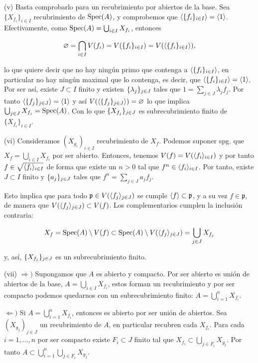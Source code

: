 \documentclass[../main.tex]{subfiles}
\begin{document}
(v) Basta comprobarlo para un recubrimiento por abiertos de la base. Sea $\{X_{f_i}\}_{i\in I}$ recubrimiento de $\text{Spec}(A)$, y comprobemos que $\langle \{f_i\}_{i\in I} \rangle = \langle 1 \rangle$. Efectivamente, como $\text{Spec}(A) = \bigcup_{i\in I}X_{f_i} $, entonces

\begin{equation}
  \varnothing = \bigcap_{i\in I} V(f_i) = V(\{f_i\}_{i\in I}) = V(\langle \{f_i\}_{i\in I} \rangle),
\end{equation}

lo que quiere decir que no hay ningún primo que contenga a $\langle \{f_i\}_{i\in I} \rangle$, en particular no hay ningún maximal que lo contenga, es decir, que $\langle \{f_i\}_{i\in I} \rangle = \langle 1 \rangle$. Por ser así, existe $J\subset I$ finito y existen $\{\lambda_j\}_{j\in J}$ tales que $1 = \sum_{j\in J} \lambda_j f_j$.
Por tanto $\langle  \{f_j\}_{j\in J} \rangle = \langle  1 \rangle$ y así  $V(\langle \{f_j\}_{j\in J} \rangle )= \varnothing$ lo que implica $\bigcup_{j\in J} X_{f_j} = \text{Spec}(A)$. Con lo que $\{X_{f_j}\}_{j\in J}$ es subrecubrimiento finito de $\{X_{f_i}\}_{i\in I}$.

(vi) Consideramos $(X_{g_i})_{i\in I}$ recubrimiento de $X_f$. Podemos suponer spg. que $X_f = \bigcup_{i\in I} X_{f_i}$ por ser abierto. Entonces, tenemos $V(f) = V(\langle f_i \rangle_{i\in I})$ y por tanto $f\in \sqrt{\langle f_i \rangle_{i\in I}}$ de forma que existe un $n>0$ tal que $f^n \in \langle f_i \rangle_{i\in I}$.
Por tanto, existe $J\subset I$ finito y $\{a_j\}_{j\in J}$ tales que $f^n = \sum_{j\in J}a_j f_j$.

Esto implica que para todo $\mathfrak p \in  V(\langle f_j \rangle_{j\in J})$ se cumple $\langle f \rangle \subset \mathfrak p$, y a su vez $f \in \mathfrak p$, de manera que $ V(\langle f_j \rangle_{j\in J}) \subset V(f)$. Los complementarios cumplen la inclusión contraria:

\[ X_f = \text{Spec}(A) \setminus V(f) \subset \text{Spec}(A) \setminus V(\langle f_j \rangle_{j\in J}) = \bigcup_{j\in J} X_{f_j} \]

y, así, $\{X_{f_j}\}_{j\in J}$ es un subrecubrimiento finito.

(vii) $\Rightarrow)$ Supongamos que $A$ es abierto y compacto. Por ser abierto es unión de abiertos de la base, $A=\bigcup_{i\in I}X_{f_i}$, estos forman un recubrimiento y por ser compacto podemos quedarnos con un subrecubrimiento finito: $A=\bigcup_{i=1}^n X_{f_i}$.

$\Leftarrow)$ Si $A=\bigcup_{i=1}^n X_{f_i}$, entonces es abierto por ser unión de abiertos. Sea $(X_{g_j})_{j\in J}$ un recubrimiento de $A$, en particular recubren cada $X_{f_i}$. Para cada $i=1,\dots, n$ por ser compacto existe $F_i \subset J$ finito tal que $X_{f_i}\subset \bigcup_{j \in F_i} X_{g_j}$. Por tanto $A \subset \bigcup_{i=1}^n \bigcup_{j \in F_i} X_{g_j}$.
\end{document}
